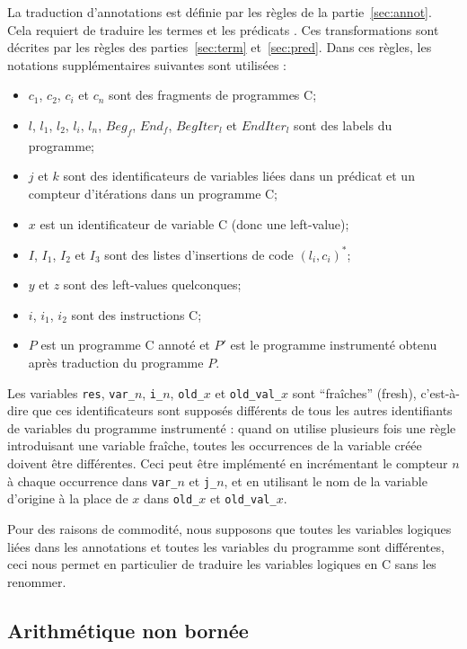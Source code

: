 La traduction d'annotations est définie par les règles de la
partie~\ref{sec:annot}.
Cela requiert de traduire les termes et les prédicats \eacsl.
Ces transformations sont décrites par les règles des parties~\ref{sec:term}
et~\ref{sec:pred}.
Dans ces règles, les notations supplémentaires suivantes sont utilisées :
\begin{itemize}
\item $c_1$, $c_2$, $c_i$ et $c_n$ sont des fragments de programmes C;
\item $l$, $l_1$, $l_2$, $l_i$, $l_n$, $\mathit{Beg_f}$, $\mathit{End_f}$,
  $\mathit{BegIter_l}$ et $\mathit{EndIter_l}$ sont des labels du programme;
\item $j$ et $k$ sont des identificateurs de variables liées
  dans un prédicat \eacsl et un compteur d'itérations dans un programme C;
\item $x$ est un identificateur de variable C (donc une left-value);
\item $I$, $I_1$, $I_2$ et $I_3$ sont des listes d'insertions de code
  $(l_i, c_i)^*$;
\item $y$ et $z$ sont des left-values quelconques;
\item $i$, $i_1$, $i_2$ sont des instructions C;
\item $P$ est un programme C annoté et $P'$ est le programme instrumenté
  obtenu après traduction du programme $P$.
\end{itemize}

Les variables \lstinline'res', \lstinline'var_'$n$, \lstinline'i_'$n$,
\lstinline'old_'$x$ et \lstinline'old_val_'$x$ sont
``fraîches'' (fresh), c'est-à-dire que ces identificateurs sont supposés
différents de tous les autres identifiants de variables du programme instrumenté
: quand on utilise plusieurs fois une règle introduisant une variable fraîche,
toutes les occurrences de la variable créée doivent être différentes.
Ceci peut être implémenté en incrémentant le compteur $n$ à chaque
occurrence dans \lstinline'var_'$n$ et \lstinline'j_'$n$, et en utilisant le nom
de la variable d'origine à la place de $x$ dans \lstinline'old_'$x$ et
\lstinline'old_val_'$x$.

Pour des raisons de commodité, nous supposons que toutes les variables logiques
liées dans les annotations et toutes les variables du programme sont
différentes, ceci nous permet en particulier de traduire les variables logiques
en C sans les renommer.


\subsection{Arithmétique non bornée}
\label{sec:integers}


